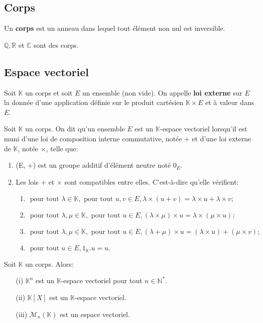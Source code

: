 \subsection{Corps}
\begin{madefinition}
	Un \textbf{corps} est un anneau dans lequel tout élément non nul est inversible.
\end{madefinition}
\begin{monexemple}
	$\mathbb{Q}, \mathbb{R}$ et $\mathbb{C}$ sont des corps. 
\end{monexemple}
\subsection{Espace vectoriel}
\begin{madefinition}
	Soit $\mathbb{K}$ un corps et soit $E$ un ensemble (non vide). On appelle \textbf{loi externe} sur $E$ la donnée d'une application définie sur le produit cartésien $\mathbb{K} \times E$ et à valeur dans $E$.
\end{madefinition}
\begin{madefinition}
	Soit $\mathbb{K}$ un corps. On dit qu’un ensemble $E$ est un $\mathbb{K}$-espace vectoriel lorsqu’il est muni d’une loi de composition interne commutative, notée + et d’une loi externe de $\mathbb{K}$, notée $\times$, telle que:
	\begin{enumerate}
		\item (E, $+$) est un groupe additif d'élément neutre noté $0_E$.
		\item Les lois $+$ et $\times$ sont compatibles entre elles. C'est-à-dire qu'elle vérifient:
		\begin{enumerate}
			\item  $\text{ pour tout } \lambda \in \mathbb{K}, \text{ pour tout } u,v \in E, \lambda \times (u+v) = \lambda \times u + \lambda \times v;$
			\item $\text{ pour tout } \lambda , \mu \in \mathbb{K}, \text{ pour tout } u \in E, (\lambda \times \mu)\times u	= \lambda \times(\mu \times u);$
			\item $\text{ pour tout } \lambda, \mu \in \mathbb{K}, \text{ pour tout } u \in E, (\lambda + \mu)\times u = (\lambda \times u) + (\mu \times v);$
			\item  $\text{ pour tout } u \in E, 1_{\mathbb{K}}.u=u.$
		\end{enumerate}
	\end{enumerate}	
\end{madefinition}
\begin{monexemple}

		Soit $\mathbb{K}$ un corps. Alors: 
		\begin{enumerate}
			\item[(i)] $\mathbb{K}^n$ est un $\mathbb{K}$-espace vectoriel pour tout $n \in \mathbb{N}^{*}$.
			\item[(ii)] $\mathbb{K}[X]$ est un $\mathbb{K}$-espace vectoriel.
			\item[(iii)] $\mathcal{M}_n(\mathbb{K})$ est un espace vectoriel.
		\end{enumerate}
\end{monexemple}

